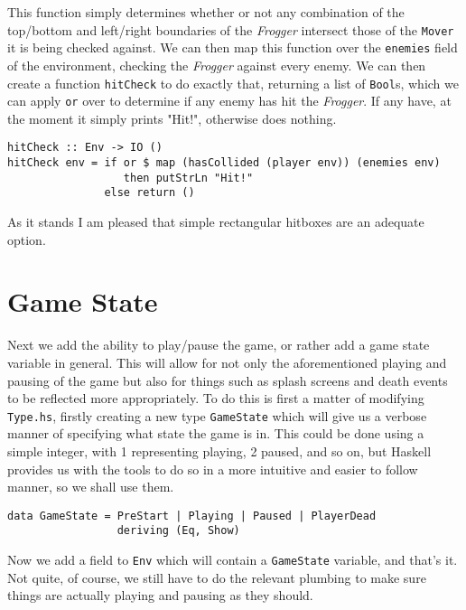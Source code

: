 \documentclass[12pt, a4paper]{report}
\begin{document}
This function simply determines whether or not any combination of the top/bottom and left/right boundaries of the \textit{Frogger} intersect those of the \verb|Mover| it is being checked against.
We can then map this function over the \verb|enemies| field of the environment, checking the \textit{Frogger} against every enemy.
We can then create a function \verb|hitCheck| to do exactly that, returning a list of \verb|Bool|s, which we can apply \verb|or| over to determine if any enemy has hit the \textit{Frogger}.
If any have, at the moment it simply prints "Hit!", otherwise does nothing.

\begin{lstlisting}
hitCheck :: Env -> IO ()
hitCheck env = if or $ map (hasCollided (player env)) (enemies env)
                  then putStrLn "Hit!"
               else return ()
\end{lstlisting}

As it stands I am pleased that simple rectangular hitboxes are an adequate option.

\section{Game State}

Next we add the ability to play/pause the game, or rather add a game state variable in general.
This will allow for not only the aforementioned playing and pausing of the game but also for things such as splash screens and death events to be reflected more appropriately.
To do this is first a matter of modifying \verb|Type.hs|, firstly creating a new type \verb|GameState| which will give us a verbose manner of specifying what state the game is in.
This could be done using a simple integer, with 1 representing playing, 2 paused, and so on, but Haskell provides us with the tools to do so in a more intuitive and easier to follow manner, so we shall use them.

\begin{lstlisting}
data GameState = PreStart | Playing | Paused | PlayerDead
                 deriving (Eq, Show)
\end{lstlisting}

Now we add a field to \verb|Env| which will contain a \verb|GameState| variable, and that's it.
Not quite, of course, we still have to do the relevant plumbing to make sure things are actually playing and pausing as they should.

\par
\end{document}
